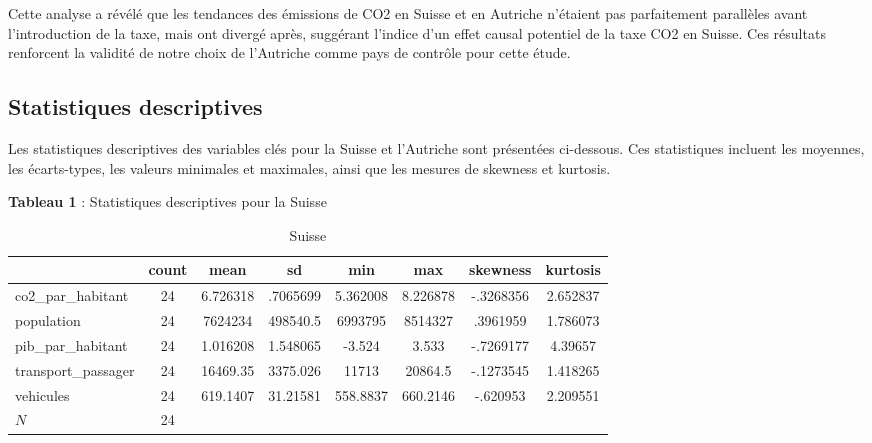 Cette analyse a révélé que les tendances des émissions de CO2 en Suisse et en Autriche n'étaient pas parfaitement parallèles avant l'introduction de la taxe, mais ont divergé après, suggérant l'indice d'un effet causal potentiel de la taxe CO2 en Suisse. Ces résultats renforcent la validité de notre choix de l'Autriche comme pays de contrôle pour cette étude.


\subsection{Statistiques descriptives}
\label{subsec:stat_descriptives}



Les statistiques descriptives des variables clés pour la Suisse et l'Autriche sont présentées ci-dessous. Ces statistiques incluent les moyennes, les écarts-types, les valeurs minimales et maximales, ainsi que les mesures de skewness et kurtosis.

\textbf{Tableau 1} : Statistiques descriptives pour la Suisse


\begin{table}[H]
    \centering
\def\sym#1{\ifmmode^{#1}\else\(^{#1}\)\fi}
    \footnotesize{
\begin{tabular}{|l*{1}{|ccccccc|}}
\hline
            &       count&        mean&          sd&         min&         max&    skewness&    kurtosis\\
\hline
co2\_par\_habitant&          24&    6.726318&    .7065699&    5.362008&    8.226878&   -.3268356&    2.652837\\
population  &          24&     7624234&    498540.5&     6993795&     8514327&    .3961959&    1.786073\\
pib\_par\_habitant&          24&    1.016208&    1.548065&      -3.524&       3.533&   -.7269177&     4.39657\\
transport\_passager&          24&    16469.35&    3375.026&       11713&     20864.5&   -.1273545&    1.418265\\
vehicules   &          24&    619.1407&    31.21581&    558.8837&    660.2146&    -.620953&    2.209551\\
\hline
\(N\)       &          24&            &            &            &            &            &            \\
\hline
\end{tabular}
}
    \caption{Suisse}
    \label{tab:Suisse}
\end{table}


